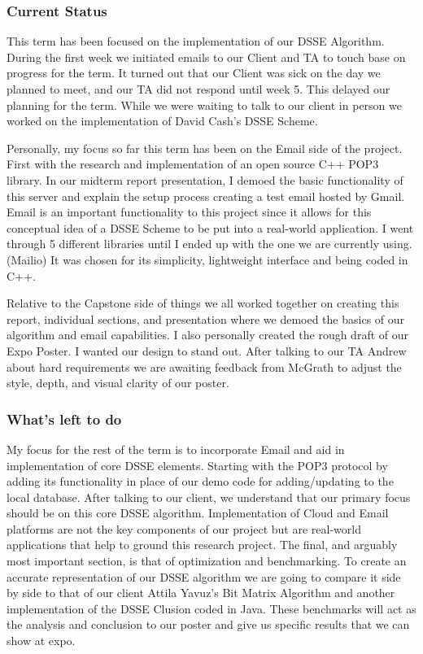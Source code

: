 \documentclass[onecolumn, draftclsnofoot,10pt, compsoc]{IEEEtran}
\begin{document}
\subsubsection{Current Status}
This term has been focused on the implementation of our DSSE Algorithm. During the first week we initiated emails to our Client and TA to touch base on progress for the term. It turned out that our Client was sick on the day we planned to meet, and our TA did not respond until week 5. This delayed our planning for the term. While we were waiting to talk to our client in person we worked on the implementation of David Cash’s DSSE Scheme. 

Personally, my focus so far this term has been on the Email side of the project. First with the research and implementation of an open source C++ POP3 library. In our midterm report presentation, I demoed the basic functionality of this server and explain the setup process creating a test email hosted by Gmail. Email is an important functionality to this project since it allows for this conceptual idea of a DSSE Scheme to be put into a real-world application. I went through 5 different libraries until I ended up with the one we are currently using. (Mailio) It was chosen for its simplicity, lightweight interface and being coded in C++.

Relative to the Capstone side of things we all worked together on creating this report, individual sections, and presentation where we demoed the basics of our algorithm and email capabilities. I also personally created the rough draft of our Expo Poster. I wanted our design to stand out. After talking to our TA Andrew about hard requirements we are awaiting feedback from McGrath to adjust the style, depth, and visual clarity of our poster.



\subsubsection{What’s left to do} 
My focus for the rest of the term is to incorporate Email and aid in implementation of core DSSE elements. Starting with the POP3 protocol by adding its functionality in place of our demo code for adding/updating to the local database. After talking to our client, we understand that our primary focus should be on this core DSSE algorithm. Implementation of Cloud and Email platforms are not the key components of our project but are real-world applications that help to ground this research project. The final, and arguably most important section, is that of optimization and benchmarking. To create an accurate representation of our DSSE algorithm we are going to compare it side by side to that of our client Attila Yavuz’s Bit Matrix Algorithm and another implementation of the DSSE Clusion coded in Java. These benchmarks will act as the analysis and conclusion to our poster and give us specific results that we can show at expo.
\end{document}
